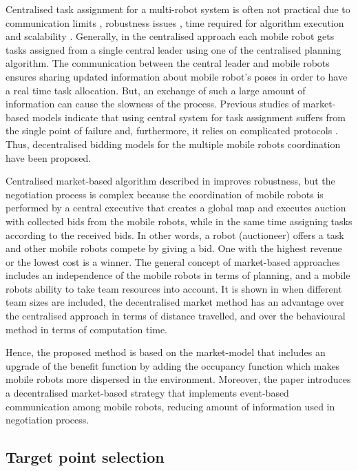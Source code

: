\documentclass[letterpaper, 10 pt, conference]{ieeeconf}  %
\begin{document}
Centralised task assignment for a multi-robot system is often not practical due to communication limits  \cite{free-market}, robustness issues \cite{survey-analysis}, time required for algorithm execution and scalability \cite{Julia}. Generally, in the centralised approach each mobile robot gets tasks assigned from a single central leader using one of the centralised planning algorithm. The communication between the central leader and mobile robots ensures sharing updated information about mobile robot's poses in order to have a real time task allocation. But, an exchange of such a large amount of information can cause the slowness of the process. Previous studies of market-based models indicate that using central system for task assignment suffers from the single point of failure and, furthermore, it relies on complicated protocols \cite{Sheng}. Thus, decentralised bidding models for the multiple mobile robots coordination have been proposed.

Centralised market-based algorithm described in \cite{burgard} improves robustness, but the negotiation process is complex because the coordination of mobile robots is performed by a central executive that creates a global map and executes auction with collected bids from the mobile robots, while in the same time assigning tasks according to the received bids. In other words, a robot (auctioneer) offers a task and other mobile robots compete by giving a bid. One with the highest revenue or the lowest cost is a winner.
The general concept of market-based approaches includes an independence of the mobile robots in terms of planning, and a mobile robots ability to take team resources into account. It is shown in \cite{usporedba} when different team sizes are included, the decentralised market method has an advantage over the centralised approach in terms of distance travelled, and over the behavioural method \cite{behavioural} in terms of computation time.

Hence, the proposed method is based on the market-model that includes an upgrade of the benefit function by adding the occupancy function which makes mobile robots more dispersed in the environment. Moreover, the paper introduces a decentralised market-based strategy that implements event-based communication among mobile robots, reducing amount of information used in negotiation process. 

\subsection{Target point selection}
\end{document}

